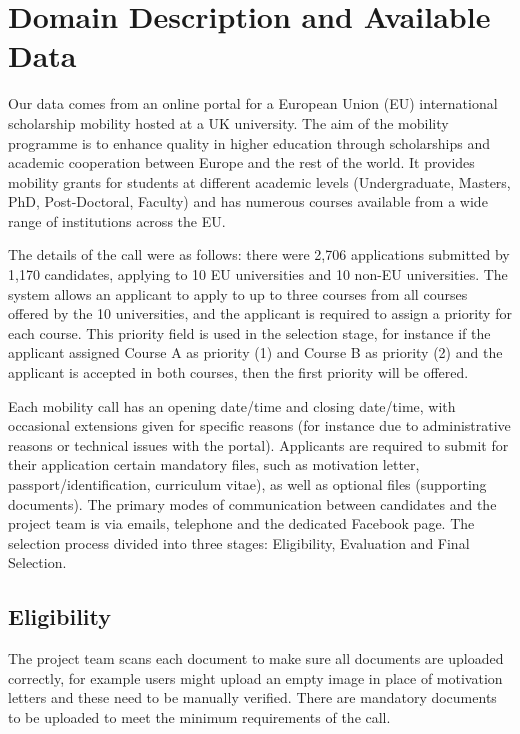 \documentclass[letterpaper]{article}
\begin{document}
\section{Domain Description and Available Data}

Our data comes from an online portal for a European Union (EU)
international scholarship mobility hosted at a UK university. The aim
of the mobility programme is to enhance quality in higher education
through scholarships and academic cooperation between Europe and the
rest of the world. It provides mobility grants for students at
different academic levels (Undergraduate, Masters, PhD, Post-Doctoral,
Faculty) and has numerous courses available from a wide range of
institutions across the EU.

The details of the call were as follows: there were 2,706 applications
submitted by 1,170 candidates, applying to 10 EU universities and 10
non-EU universities. The system allows an applicant to apply to up to
three courses from all courses offered by the 10 universities, and the
applicant is required to assign a priority for each course. This
priority field is used in the selection stage, for instance if the
applicant assigned Course A as priority (1) and Course B as priority
(2) and the applicant is accepted in both courses, then the first
priority will be offered.

Each mobility call has an opening date/time and closing date/time,
with occasional extensions given for specific reasons (for instance
due to administrative reasons or technical issues with the
portal). Applicants are required to submit for their application
certain mandatory files, such as motivation letter,
passport/identification, curriculum vitae), as well as optional files
(supporting documents). The primary modes of communication between
candidates and the project team is via emails, telephone and the
dedicated Facebook page. The selection process divided into three
stages: Eligibility, Evaluation and Final Selection.

\subsection{Eligibility}

The project team scans each document to make sure all documents are
uploaded correctly, for example users might upload an empty image in
place of motivation letters and these need to be manually
verified. There are mandatory documents to be uploaded to meet the
minimum requirements of the call.
\end{document}
